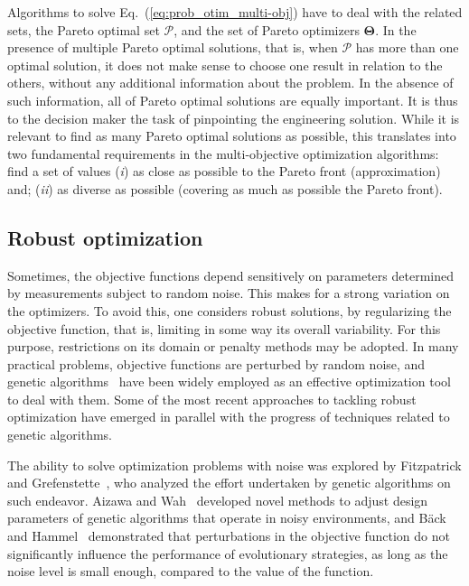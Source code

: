 \documentclass[final,5p,times,twocolumn,numbers]{elsarticle}
\begin{document}
Algorithms to solve Eq.~(\ref{eq:prob_otim_multi-obj}) have to deal with the related sets, the Pareto optimal set $ \boldsymbol{\mathcal{P}} $, and the set of Pareto optimizers $ \mathbf{\Theta} $. In the presence of multiple Pareto optimal solutions, that is, when $ \boldsymbol{\mathcal{P}} $ has more than one optimal solution, it does not make sense to choose one result in relation to the others, without any additional information about the problem. In the absence of such information, all of Pareto optimal solutions are equally important. It is thus to the decision maker the task of pinpointing the engineering solution. While it is relevant to find as many Pareto optimal solutions as possible, this translates into two fundamental requirements in the multi-objective optimization algorithms: find a set of values (\textit{i}) as close as possible to the Pareto front (approximation) and; (\textit{ii}) as diverse as possible (covering as much as possible the Pareto front).

\subsection{Robust optimization} \label{sec:robust_optimization}

Sometimes, the objective functions depend sensitively on parameters determined by measurements subject to random noise. This makes for a strong variation on the optimizers. To avoid this, one considers robust solutions, by regularizing the objective function, that is, limiting in some way its overall variability. For this purpose, restrictions on its domain or penalty methods may be adopted. In many practical problems, objective functions are perturbed by random noise, and genetic algorithms~\cite{bib:holland1973,bib:holland1975,bib:dejong1975,bib:goldberg1989} have been widely employed as an effective optimization tool to deal with them. Some of the most recent approaches to tackling robust optimization have emerged in parallel with the progress of techniques related to genetic algorithms.

The ability to solve optimization problems with noise was explored by Fitzpatrick and Grefenstette~\cite{bib:fitzpatrick1988}, who analyzed the effort undertaken by genetic algorithms on such endeavor. Aizawa and Wah~\cite{bib:aizawa1994} developed novel methods to adjust design parameters of genetic algorithms that operate in noisy environments, and B{\"a}ck and Hammel~\cite{bib:back1994} demonstrated that perturbations in the objective function do not significantly influence the performance of evolutionary strategies, as long as the noise level is small enough, compared to the value of the function.
\end{document}
